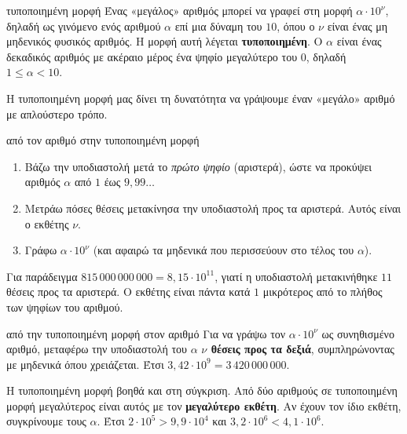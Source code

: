 \begin{orismos}{τυποποιημένη μορφή}
Ένας «μεγάλος» αριθμός μπορεί να γραφεί στη μορφή $\alpha\cdot10^{\nu}$, δηλαδή ως γινόμενο ενός αριθμού $\alpha$ επί μια δύναμη του $10$, όπου ο $\nu$ είναι ένας μη μηδενικός φυσικός αριθμός. Η μορφή αυτή λέγεται \textbf{τυποποιημένη}. Ο $\alpha$ είναι ένας δεκαδικός αριθμός με ακέραιο μέρος ένα ψηφίο μεγαλύτερο του $0$, δηλαδή $1\le\alpha<10$.
\end{orismos}

Η τυποποιημένη μορφή μας δίνει τη δυνατότητα να γράψουμε έναν «μεγάλο» αριθμό με απλούστερο τρόπο.

\begin{kanonas}{από τον αριθμό στην τυποποιημένη μορφή}
\begin{enumerate}[leftmargin=1.6em,itemsep=0.2ex,topsep=2pt]
\item Βάζω την υποδιαστολή μετά το \emph{πρώτο ψηφίο} (αριστερά), ώστε να προκύψει αριθμός $\alpha$ από $1$ έως $9{,}99\ldots$
\item Μετράω πόσες θέσεις μετακίνησα την υποδιαστολή προς τα αριστερά. Αυτός είναι ο εκθέτης $\nu$.
\item Γράφω $\alpha\cdot10^{\nu}$ (και αφαιρώ τα μηδενικά που περισσεύουν στο τέλος του $\alpha$).
\end{enumerate}
Για παράδειγμα $815\,000\,000\,000=8{,}15\cdot10^{11}$, γιατί η υποδιαστολή μετακινήθηκε $11$ θέσεις προς τα αριστερά. Ο εκθέτης είναι πάντα κατά $1$ μικρότερος από το πλήθος των ψηφίων του αριθμού.
\end{kanonas}

\begin{kanonas}{από την τυποποιημένη μορφή στον αριθμό}
Για να γράψω τον $\alpha\cdot10^{\nu}$ ως συνηθισμένο αριθμό, μεταφέρω την υποδιαστολή του $\alpha$ \textbf{$\nu$ θέσεις προς τα δεξιά}, συμπληρώνοντας με μηδενικά όπου χρειάζεται. Έτσι $3{,}42\cdot10^9=3\,420\,000\,000$.
\end{kanonas}

Η τυποποιημένη μορφή βοηθά και στη σύγκριση. Από δύο αριθμούς σε τυποποιημένη μορφή μεγαλύτερος είναι αυτός με τον \textbf{μεγαλύτερο εκθέτη}. Αν έχουν τον ίδιο εκθέτη, συγκρίνουμε τους $\alpha$. Έτσι $2\cdot10^{5}>9{,}9\cdot10^{4}$ και $3{,}2\cdot10^{6}<4{,}1\cdot10^{6}$.

